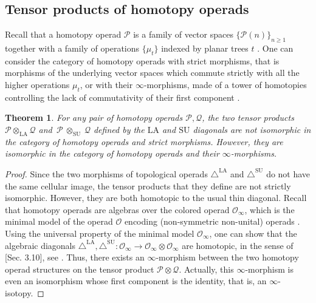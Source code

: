 \documentclass{amsart}
\newtheorem{theorem}{Theorem}[section]
\theoremstyle{definition}
\newcommand{\SU}{\mathrm{SU}}
\newcommand{\LA}{\mathrm{LA}}
\newcommand{\SUD}{\triangle^{\mathrm{SU}}}
\newcommand{\LAD}{\triangle^{\mathrm{LA}}}
\begin{document}

\subsection{Tensor products of homotopy operads}
\label{subsec:tensor-products}
Recall that a homotopy operad $\mathcal{P}$ is a family of vector spaces $\{\mathcal{P}(n)\}_{n \geq 1}$ together with a family of operations $\{\mu_t\}$ indexed by planar trees $t$ \cite[Def. 4.11]{LaplanteAnfossi}.
One can consider the category of homotopy operads with strict morphisms, that is morphisms of the underlying vector spaces which commute strictly with all the higher operations $\mu_t$, or with their $\infty$-morphisms, made of a tower of homotopies controlling the lack of commutativity of their first component \cite[Sec. 10.5.2]{LodayVallette}.

\begin{theorem}
\label{thm:infinity-iso}
For any pair of homotopy operads $\mathcal{P},\mathcal{Q}$, the two tensor products~$\mathcal{P} \otimes_\LA \mathcal{Q}$ and~$\mathcal{P}~\otimes_\SU~\mathcal{Q}$ defined by the $\LA$ and $\SU$ diagonals are not isomorphic in the category of homotopy operads and strict morphisms.
However, they are isomorphic in the category of homotopy operads and their $\infty$-morphisms.
\end{theorem}

\begin{proof}
Since the two morphisms of topological operads $\LAD$ and $\SUD$ do not have the same cellular image, the tensor products that they define are not strictly isomorphic.
However, they are both homotopic to the usual thin diagonal.
Recall that homotopy operads are algebras over the colored operad $\mathcal{O}_\infty$, which is the minimal model of the operad $\mathcal{O}$ encoding (non-symmetric non-unital) operads \cite[Prop. 4.9]{LaplanteAnfossi}. 
Using the universal property of the minimal model $\mathcal{O}_\infty$, one can show that the algebraic diagonals $\LAD,\SUD : \mathcal{O}_\infty \to \mathcal{O}_\infty \otimes \mathcal{O}_\infty$ are homotopic, in the sense of \cite{MarklShniderStasheff}[Sec. 3.10], see \cite[Prop. 3.136]{MarklShniderStasheff}.
Thus, there exists an $\infty$-morphism between the two homotopy operad structures on the tensor product $\mathcal{P} \otimes \mathcal{Q}$.
Actually, this $\infty$-morphism is even an isomorphism whose first component is the identity, that is, an $\infty$-isotopy. 
\end{proof}
\end{document}
